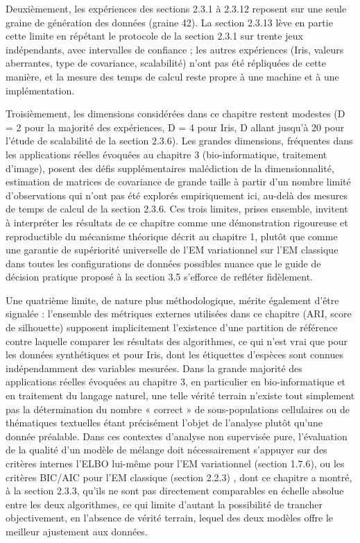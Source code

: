 Deuxièmement, les expériences des sections 2.3.1 à 2.3.12 reposent sur une seule graine de génération des données (graine 42). La section 2.3.13 lève en partie cette limite en répétant le protocole de la section 2.3.1 sur trente jeux indépendants, avec intervalles de confiance ; les autres expériences (Iris, valeurs aberrantes, type de covariance, scalabilité) n'ont pas été répliquées de cette manière, et la mesure des temps de calcul reste propre à une machine et à une implémentation.

Troisièmement, les dimensions considérées dans ce chapitre restent modestes (D = 2 pour la majorité des expériences, D = 4 pour Iris, D allant jusqu'à 20 pour l'étude de scalabilité de la section 2.3.6). Les grandes dimensions, fréquentes dans les applications réelles évoquées au chapitre 3 (bio-informatique, traitement d'image), posent des défis supplémentaires  malédiction de la dimensionnalité, estimation de matrices de covariance de grande taille à partir d'un nombre limité d'observations  qui n'ont pas été explorés empiriquement ici, au-delà des mesures de temps de calcul de la section 2.3.6. Ces trois limites, prises ensemble, invitent à interpréter les résultats de ce chapitre comme une démonstration rigoureuse et reproductible du mécanisme théorique décrit au chapitre 1, plutôt que comme une garantie de supériorité universelle de l'EM variationnel sur l'EM classique dans toutes les configurations de données possibles  nuance que le guide de décision pratique proposé à la section 3.5 s'efforce de refléter fidèlement.

Une quatrième limite, de nature plus méthodologique, mérite également d'être signalée : l'ensemble des métriques externes utilisées dans ce chapitre (ARI, score de silhouette) supposent implicitement l'existence d'une partition de référence contre laquelle comparer les résultats des algorithmes, ce qui n'est vrai que pour les données synthétiques et pour Iris, dont les étiquettes d'espèces sont connues indépendamment des variables mesurées. Dans la grande majorité des applications réelles évoquées au chapitre 3, en particulier en bio-informatique et en traitement du langage naturel, une telle vérité terrain n'existe tout simplement pas  la détermination du nombre « correct » de sous-populations cellulaires ou de thématiques textuelles étant précisément l'objet de l'analyse plutôt qu'une donnée préalable. Dans ces contextes d'analyse non supervisée pure, l'évaluation de la qualité d'un modèle de mélange doit nécessairement s'appuyer sur des critères internes  l'ELBO lui-même pour l'EM variationnel (section 1.7.6), ou les critères BIC/AIC pour l'EM classique (section 2.2.3) , dont ce chapitre a montré, à la section 2.3.3, qu'ils ne sont pas directement comparables en échelle absolue entre les deux algorithmes, ce qui limite d'autant la possibilité de trancher objectivement, en l'absence de vérité terrain, lequel des deux modèles offre le meilleur ajustement aux données.



